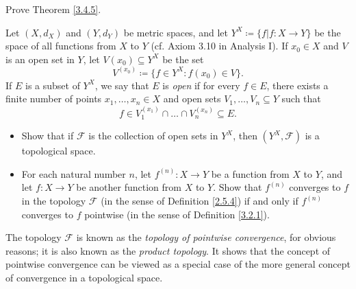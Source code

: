 \begin{exercise}\label{ex 3.4.3}
    Prove Theorem \ref{3.4.5}.
\end{exercise}

\begin{exercise}\label{ex 3.4.4}
    Let \((X, d_X)\) and \((Y, d_Y)\) be metric spaces, and let \(Y^X \coloneqq \{f | f : X \to Y \}\) be the space of all functions from \(X\) to \(Y\)
    (cf. Axiom 3.10 in Analysis I).
    If \(x_0 \in X\) and \(V\) is an open set in \(Y\), let \(V(x_0) \subseteq Y^X\) be the set
    \[
        V^{(x_0)} \coloneqq \{f \in Y^X : f(x_0) \in V\}.
    \]
    If \(E\) is a subset of \(Y^X\), we say that \(E\) is \emph{open} if for every \(f \in E\), there exists a finite number of points \(x_1, \dots, x_n \in X\) and open sets \(V_1, \dots, V_n \subseteq Y\) such that
    \[
        f \in V_1^{(x_1)} \cap \dots \cap V_n^{(x_n)} \subseteq E.
    \]
    \begin{itemize}
        \item Show that if \(\mathcal{F}\) is the collection of open sets in \(Y^X\), then \((Y^X , \mathcal{F})\) is a topological space.
        \item For each natural number \(n\), let \(f^{(n)} : X \to Y\) be a function from \(X\) to \(Y\), and let \(f : X \to Y\) be another function from \(X\) to \(Y\).
              Show that \(f^{(n)}\) converges to \(f\) in the topology \(\mathcal{F}\) (in the sense of Definition \ref{2.5.4}) if and only if \(f^{(n)}\) converges to \(f\) pointwise (in the sense of Definition \ref{3.2.1}).
    \end{itemize}
    The topology \(\mathcal{F}\) is known as the \emph{topology of pointwise convergence}, for obvious reasons;
    it is also known as the \emph{product topology}.
    It shows that the concept of pointwise convergence can be viewed as a special case of the more general concept of convergence in a topological space.
\end{exercise}